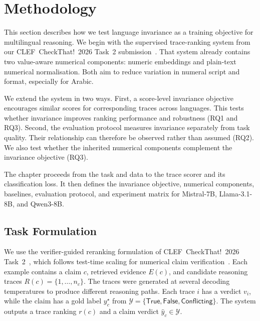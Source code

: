 %

\section{Methodology}
\label{sec:methodology}

This section describes how we test language invariance as a training objective for multilingual
reasoning. We begin with the supervised trace-ranking system from our CLEF~CheckThat!~2026 Task~2
submission~\cite{khawaja2026gipplab,clef-checkthat:2026:task2}. That system already contains two
value-aware numerical components: numeric embeddings and plain-text numerical normalisation. Both aim
to reduce variation in numeral script and format, especially for Arabic.

We extend the system in two ways. First, a score-level invariance objective encourages similar scores
for corresponding traces across languages. This tests whether invariance improves ranking performance
and robustness (RQ1 and RQ3). Second, the evaluation protocol measures invariance separately from task
quality. Their relationship can therefore be observed rather than assumed (RQ2). We also test whether
the inherited numerical components complement the invariance objective (RQ3).

The chapter proceeds from the task and data to the trace scorer and its classification loss. It then
defines the invariance objective, numerical components, baselines, evaluation protocol, and experiment
matrix for Mistral-7B, Llama-3.1-8B, and Qwen3-8B.

\subsection{Task Formulation}
\label{subsec:method-task}

We use the verifier-guided reranking formulation of CLEF~CheckThat!~2026
Task~2~\cite{clef-checkthat:2026:task2}, which follows test-time scaling for numerical claim
verification~\cite{chungkham2025thinkrightmoretesttime,v2024quantemprealworldopendomainbenchmark}.
Each example contains a claim $c$, retrieved evidence $E(c)$, and candidate reasoning traces
$R(c)=\{1,\dots,n_c\}$. The traces were generated at several decoding temperatures to produce
different reasoning paths. Each trace $i$ has a verdict $v_i$, while the claim has a gold label
$y^\star_c$ from
$\mathcal{Y}=\{\textsf{True},\textsf{False},\textsf{Conflicting}\}$. The system outputs a trace
ranking $r(c)$ and a claim verdict $\hat{y}_c\in\mathcal{Y}$.

